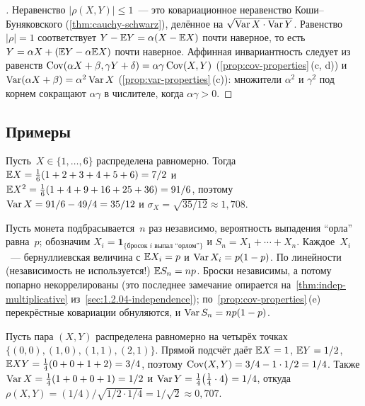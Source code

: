\begin{proof}[]
Неравенство $|\rho(X, Y)| \leq 1$~--- это ковариационное неравенство Коши--Буняковского (\cref{thm:cauchy-schwarz}), делённое на $\sqrt{\operatorname{Var} X \cdot \operatorname{Var} Y}$. Равенство $|\rho| = 1$ соответствует $Y - \mathbb{E} Y = \alpha (X - \mathbb{E} X)$ почти наверное, то есть $Y = \alpha X + (\mathbb{E} Y - \alpha \mathbb{E} X)$ почти наверное. Аффинная инвариантность следует из равенств $\operatorname{Cov}(\alpha X + \beta, \gamma Y + \delta) = \alpha \gamma \operatorname{Cov}(X, Y)$ (\cref{prop:cov-properties}\,(c, d)) и $\operatorname{Var}(\alpha X + \beta) = \alpha^2 \operatorname{Var} X$ (\cref{prop:var-properties}\,(c)): множители $\alpha^2$ и $\gamma^2$ под корнем сокращают $\alpha \gamma$ в числителе, когда $\alpha \gamma > 0$.
\end{proof}

\subsection*{Примеры}

\begin{example}
\label{ex:die-moments}
Пусть~$X \in \{1, \dots, 6\}$ распределена равномерно. Тогда $\mathbb{E} X = \tfrac{1}{6}(1 + 2 + 3 + 4 + 5 + 6) = 7/2$ и $\mathbb{E} X^2 = \tfrac{1}{6}(1 + 4 + 9 + 16 + 25 + 36) = 91/6$, поэтому $\operatorname{Var} X = 91/6 - 49/4 = 35/12$ и $\sigma_X = \sqrt{35/12} \approx 1{,}708$.
\end{example}

\begin{example}
\label{ex:binomial-moments}
Пусть монета подбрасывается~$n$ раз независимо, вероятность выпадения ``орла'' равна~$p$; обозначим $X_i = \mathbf{1}_{\{\text{бросок } i \text{ выпал ``орлом''}\}}$ и $S_n = X_1 + \cdots + X_n$. Каждое~$X_i$~--- бернуллиевская величина с $\mathbb{E} X_i = p$ и $\operatorname{Var} X_i = p(1 - p)$. По линейности (независимость не используется!) $\mathbb{E} S_n = np$. Броски независимы, а потому попарно некоррелированы (это последнее замечание опирается на~\cref{thm:indep-multiplicative} из~\cref{sec:1.2.04-independence}); по~\cref{prop:cov-properties}\,(e) перекрёстные ковариации обнуляются, и $\operatorname{Var} S_n = n p (1 - p)$.
\end{example}

\begin{example}
\label{ex:cov-pair}
Пусть пара $(X, Y)$ распределена равномерно на четырёх точках $\{(0, 0), (1, 0), (1, 1), (2, 1)\}$. Прямой подсчёт даёт $\mathbb{E} X = 1$, $\mathbb{E} Y = 1/2$, $\mathbb{E} XY = \tfrac{1}{4}(0 + 0 + 1 + 2) = 3/4$, поэтому $\operatorname{Cov}(X, Y) = 3/4 - 1 \cdot 1/2 = 1/4$. Также $\operatorname{Var} X = \tfrac{1}{4}(1 + 0 + 0 + 1) = 1/2$ и $\operatorname{Var} Y = \tfrac{1}{4}\bigl(\tfrac{1}{4} \cdot 4\bigr) = 1/4$, откуда $\rho(X, Y) = (1/4) / \sqrt{1/2 \cdot 1/4} = 1/\sqrt{2} \approx 0{,}707$.
\end{example}

